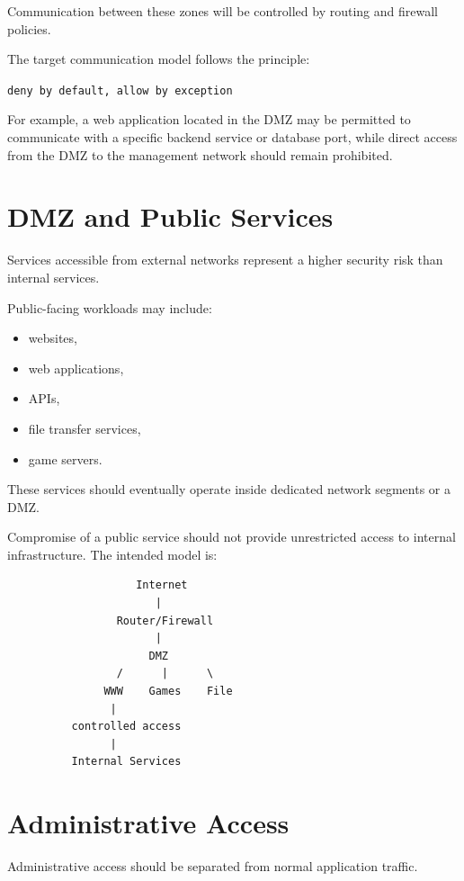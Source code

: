 Communication between these zones will be controlled by routing and
firewall policies.

The target communication model follows the principle:

\begin{center}
\texttt{deny by default, allow by exception}
\end{center}

For example, a web application located in the DMZ may be permitted to
communicate with a specific backend service or database port, while direct
access from the DMZ to the management network should remain prohibited.


\section{DMZ and Public Services}

Services accessible from external networks represent a higher security risk
than internal services.

Public-facing workloads may include:

\begin{itemize}
    \item websites,
    \item web applications,
    \item APIs,
    \item file transfer services,
    \item game servers.
\end{itemize}

These services should eventually operate inside dedicated network segments
or a DMZ.

Compromise of a public service should not provide unrestricted access to
internal infrastructure.
\newpage
The intended model is:

\begin{verbatim}
                    Internet
                       |
                 Router/Firewall
                       |
                      DMZ
                 /      |      \
               WWW    Games    File
                |
          controlled access
                |
          Internal Services
\end{verbatim}


\section{Administrative Access}

Administrative access should be separated from normal application traffic.

